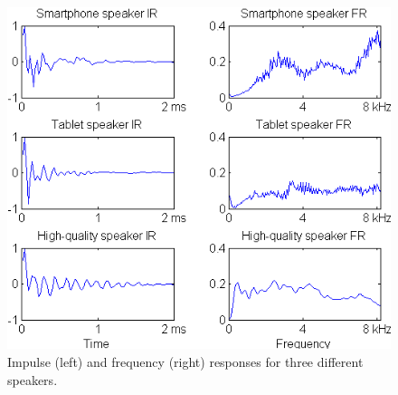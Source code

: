 
\begin{figure}
	\centering
	\includegraphics[width=1\linewidth]{Figs/IRs.png}
	\caption{Impulse (left) and frequency (right) responses for three different speakers.} %
	\label{fig::IRs}
\end{figure}


